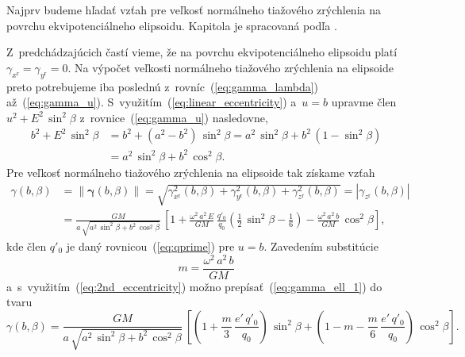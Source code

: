 \documentclass[a4paper, 12pt]{book}
\begin{document}
Najprv budeme hľadať vzťah pre veľkosť normálneho tiažového zrýchlenia na 
povrchu ekvipotenciálneho elipsoidu.  Kapitola je spracovaná podľa 
\textcite{MoritzPhysicalGeodesy}.

Z~predchádzajúcich častí vieme, že na povrchu ekvipotenciálneho elipsoidu 
platí~$\gamma_{x^\mathrm{r}} = \gamma_{y^\mathrm{r}} = 0$.  Na výpočet veľkosti 
normálneho tiažového zrýchlenia na elipsoide preto potrebujeme iba poslednú 
z~rovníc~(\ref{eq:gamma_lambda}) až~(\ref{eq:gamma_u}).  
S~využitím~(\ref{eq:linear_eccentricity}) a~$u = b$ upravme člen~$u^2 + E^2 \, 
\sin^2\beta$ z~rovnice~(\ref{eq:gamma_u}) nasledovne,
%
\begin{equation}
\begin{split}
b^2 + E^2 \, \sin^2\beta &= b^2 + (a^2 - b^2) \, \sin^2\beta = a^2 \, 
\sin^2\beta + b^2 \, (1 - \sin^2\beta)\\
%
&= a^2 \, \sin^2\beta + b^2 \, \cos^2\beta{.}
\end{split}
\end{equation}
%
Pre veľkosť normálneho tiažového zrýchlenia na elipsoide tak získame vzťah
%
\begin{equation}
\label{eq:gamma_ell_1}
\begin{split}
\gamma(b, \beta) &= \| \boldsymbol \gamma(b, \beta) \| 
= \sqrt{\gamma^2_{x^\mathrm{r}}(b, \beta) + \gamma^2_{y^\mathrm{r}}(b, \beta) 
+ \gamma^2_{z^\mathrm{r}}(b, \beta)} = | \gamma_{z^\mathrm{r}}(b, \beta) |\\
%
&= \frac{GM}{a \, \sqrt{a^2 \, \sin^2\beta + b^2 \, \cos^2\beta}} \, \left[ 
1 + \frac{\omega^2 \, a^2 \, E}{GM} \, \frac{q'_0}{q_0} \left( \frac{1}{2} \, 
\sin^2\beta - \frac{1}{6} \right) - \frac{\omega^2 \, a^2 \, b}{GM} \, 
\cos^2\beta \right]
{,}
\end{split}
\end{equation}
%
kde člen $q'_0$ je daný rovnicou~(\ref{eq:qprime}) pre $u = b$.  Zavedením 
substitúcie
%
\begin{equation}
m = \frac{\omega^2 \, a^2 \, b}{GM}
\end{equation}
%
a~s~využitím~(\ref{eq:2nd_eccentricity}) možno prepísať~(\ref{eq:gamma_ell_1}) 
do tvaru
%
\begin{equation}
\label{eq:gamma_ell_2}
\gamma(b, \beta) = \frac{GM}{a \, \sqrt{a^2 \, \sin^2\beta + b^2 \, 
\cos^2\beta}} \, \left[ \left( 1 + \frac{m}{3} \, \frac{e' \, q'_0}{q_0} 
\right) \, \sin^2\beta + \left( 1 - m - \frac{m}{6} \, \frac{e' \, q'_0}{q_0} 
\right) \, \cos^2\beta
\right]{.}
\end{equation}
\end{document}
